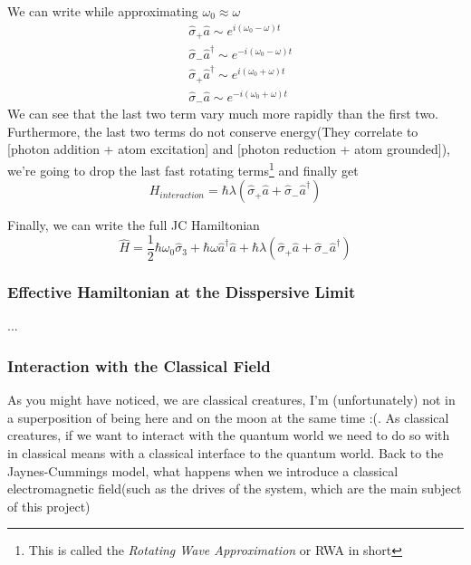 \documentclass[english, a4paper, 12pt, twoside]{article}
\numberwithin{equation}{section} %
\begin{document}
We can write while approximating $\omega_0 \approx \omega$
\begin{equation}
    \begin{split}
        &\hat{\sigma}_+\hat{a} \sim e^{i(\omega_0 - \omega)t}\\
        &\hat{\sigma}_-\hat{a}^\dag \sim e^{-i(\omega_0 - \omega)t}\\
        &\hat{\sigma}_+\hat{a}^\dag \sim e^{i(\omega_0 + \omega)t}\\
        &\hat{\sigma}_-\hat{a} \sim e^{-i(\omega_0 + \omega)t}
    \end{split}
\end{equation}
We can see that the last two term vary much more rapidly than the first two. Furthermore, the last two terms do not conserve energy(They correlate to [photon addition + atom excitation] and [photon reduction + atom grounded]), we're going to drop the last fast rotating terms\footnote{This is called the \textit{Rotating Wave Approximation} or RWA in short} and finally get
\begin{equation}
    \boxed{H_{interaction} = \hbar\lambda(\hat{\sigma}_+\hat{a} + \hat{\sigma}_-\hat{a}^\dag)}
\end{equation}

\par

Finally, we can write the full JC Hamiltonian
\begin{equation}
    \boxed{\hat{H} = \frac{1}{2}\hbar \omega_0\hat{\sigma}_3 
                     + \hbar \omega \hat{a}^\dag \hat{a} 
                     +  \hbar\lambda(\hat{\sigma}_+\hat{a} + \hat{\sigma}_-\hat{a}^\dag)}
\end{equation}

\subsubsection{Effective Hamiltonian at the Disspersive Limit}
...
\subsubsection{Interaction with the Classical Field} \label{sec:interaction-with_classical-field}
As you might have noticed, we are classical creatures, I'm (unfortunately) not in a superposition of being here and on the moon at the same time :(. As classical creatures, if we want to interact with the quantum world we need to do so with in classical means with a classical interface to the quantum world. Back to the Jaynes-Cummings model, what happens when we introduce a classical electromagnetic field(such as the drives of the system, which are the main subject of this project)
\end{document}
